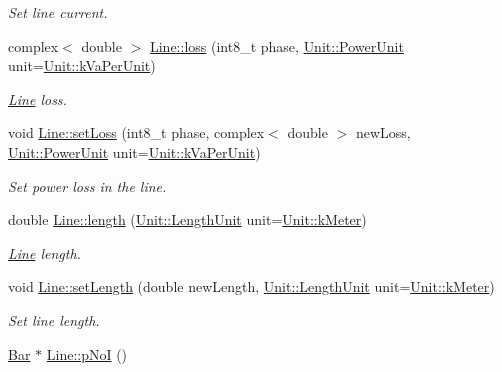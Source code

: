 \begin{DoxyCompactItemize}
\begin{DoxyCompactList}\small\item\em Set line current. \end{DoxyCompactList}\item 
complex$<$ double $>$ \hyperlink{group___models_ga511d4e89d613d4f222480476f2da3abe}{Line\+::loss} (int8\+\_\+t phase, \hyperlink{class_unit_ace265ae255370ccacfd5370337572c3b}{Unit\+::\+Power\+Unit} unit=\hyperlink{class_unit_ace265ae255370ccacfd5370337572c3bae056e80d620a87c61a44c359e6b05cc1}{Unit\+::k\+Va\+Per\+Unit})
\begin{DoxyCompactList}\small\item\em \hyperlink{class_line}{Line} loss. \end{DoxyCompactList}\item 
void \hyperlink{group___models_gaf154792ce92a49027384b29de75373b9}{Line\+::set\+Loss} (int8\+\_\+t phase, complex$<$ double $>$ new\+Loss, \hyperlink{class_unit_ace265ae255370ccacfd5370337572c3b}{Unit\+::\+Power\+Unit} unit=\hyperlink{class_unit_ace265ae255370ccacfd5370337572c3bae056e80d620a87c61a44c359e6b05cc1}{Unit\+::k\+Va\+Per\+Unit})
\begin{DoxyCompactList}\small\item\em Set power loss in the line. \end{DoxyCompactList}\item 
double \hyperlink{group___models_gae2e4500d0fa60dcc2ecb08b2c96954f9}{Line\+::length} (\hyperlink{class_unit_a8c8921f7b225ad6063b1cb573425b9a0}{Unit\+::\+Length\+Unit} unit=\hyperlink{class_unit_a8c8921f7b225ad6063b1cb573425b9a0abfa41ebe7ee649a1f02c9b8ae570434b}{Unit\+::k\+Meter})
\begin{DoxyCompactList}\small\item\em \hyperlink{class_line}{Line} length. \end{DoxyCompactList}\item 
void \hyperlink{group___models_ga950d0b8f5d167eda430c65ca7adadbb0}{Line\+::set\+Length} (double new\+Length, \hyperlink{class_unit_a8c8921f7b225ad6063b1cb573425b9a0}{Unit\+::\+Length\+Unit} unit=\hyperlink{class_unit_a8c8921f7b225ad6063b1cb573425b9a0abfa41ebe7ee649a1f02c9b8ae570434b}{Unit\+::k\+Meter})
\begin{DoxyCompactList}\small\item\em Set line length. \end{DoxyCompactList}\item 
\hyperlink{class_bar}{Bar} $\ast$ \hyperlink{group___models_gaeafd90e84ac2f8de2a879abe9e53eef3}{Line\+::p\+No\+I} ()

\end{DoxyCompactItemize}
